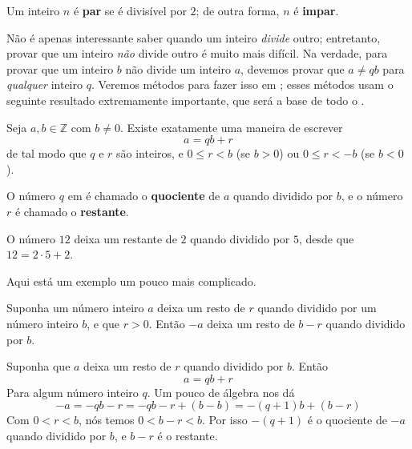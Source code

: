 \begin{definition}
\label{defEvenOdd}
Um inteiro $n$ é \textbf{par} se é divisível por $2$; de outra forma, $n$ é \textbf{impar}.
\end{definition}
Não é apenas interessante saber quando um inteiro \textit{divide} outro; entretanto, provar que um inteiro \textit{não} divide outro é muito mais difícil. Na verdade, para provar que um inteiro $b$ não divide um inteiro $a$, devemos provar que $a \ne qb$ para \textit{qualquer} inteiro $q$. Veremos métodos para fazer isso em ; esses métodos usam o seguinte resultado extremamente importante, que será a base de todo o .

\begin{theorem}
\label{thmDivisionPreliminary}
Seja $a,b \in \mathbb{Z}$ com $b \ne 0$. Existe exatamente uma maneira de escrever
\[ a = qb + r \]
de tal modo que $q$ e $r$ são inteiros, e $0 \le r < b$ (se $b > 0$) ou $0 \le r < -b$ (se $b < 0$).
\end{theorem}

O número $q$ em  é chamado o \textbf{quociente} de $a$ quando dividido por $b$, e o número $r$ é chamado o \textbf{restante}.

\begin{example}
O número $12$ deixa um  restante de $2$ quando dividido por $5$, desde que $12 = 2 \cdot 5 + 2$.
\end{example}

Aqui está um exemplo um pouco mais complicado.

\begin{proposition}
Suponha um número inteiro $a$ deixa um resto de $r$ quando dividido por um número inteiro $b$, e que $r>0$. Então $-a$ deixa um resto de $b-r$ quando dividido por $b$.
\end{proposition}

\begin{cproof}
Suponha que $a$ deixa um resto de $r$ quando dividido por $b$. Então
\[ a=qb+r \]
Para algum número inteiro $q$. Um pouco de álgebra nos dá
\[ -a = -qb-r = -qb-r+(b-b) = -(q+1)b + (b-r) \]
Com $0<r<b$, nós temos $0<b-r<b$. Por isso $-(q+1)$ é o quociente de $-a$ quando dividido por $b$, e $b-r$ é o restante.
\end{cproof}

